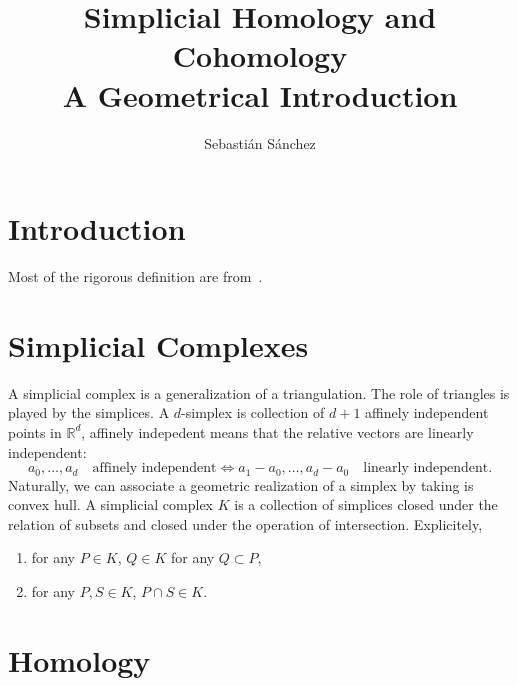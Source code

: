 \documentclass{article}
\title{Simplicial Homology and Cohomology\\ A Geometrical Introduction}
\author{Sebastián Sánchez}
\newcommand{\R}{\mathbb R}
\begin{document}
\maketitle

\section{Introduction}

Most of the rigorous definition are from~\cite{munkres}.

\section{Simplicial Complexes}

A simplicial complex is a generalization of a triangulation. The role of triangles is
played by the simplices. A \(d\)-simplex is collection of \(d+1\) affinely independent points
in \(\R^{d}\), affinely indepedent means that the relative vectors are linearly independent:
\begin{displaymath}
  a_0, \dots, a_d \quad\textrm{affinely independent}
  \iff
  a_1-a_0, \dots, a_d-a_0 \quad\textrm{linearly independent}.
\end{displaymath}
Naturally, we can associate a geometric realization of a simplex by taking is convex hull.
A simplicial complex \(K\) is a collection of simplices closed under the relation of subsets and 
closed under the operation of intersection. Explicitely,
\begin{enumerate}
  \item for any \(P\in K\), \(Q\in K\) for any \(Q\subset P\),
  \item for any \(P, S\in K\), \(P\cap S \in K\).
\end{enumerate}

\section{Homology}
\end{document}
